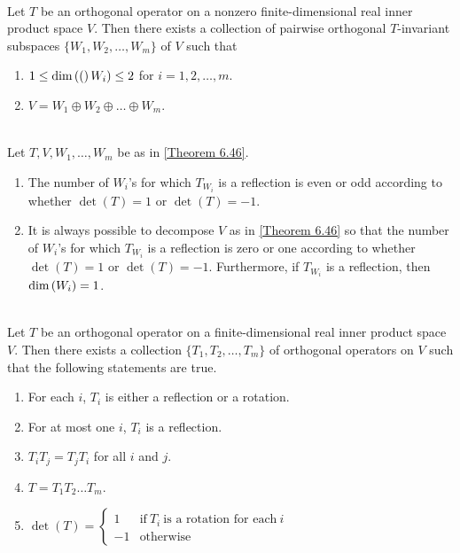 \begin{theorem}\label{Theorem 6.46}
	\hfill\\
	Let $T$ be an orthogonal operator on a nonzero finite-dimensional real inner product space $V$. Then there exists a collection of pairwise orthogonal $T$-invariant subspaces $\{W_1, W_2, \dots, W_m\}$ of $V$ such that

	\begin{enumerate}
		\item $1 \leq \text{dim}\left((\right)W_i) \leq 2$ for $i = 1, 2, \dots, m$.
		\item $V = W_1 \oplus W_2 \oplus \dots \oplus W_m$.
	\end{enumerate}
\end{theorem}

\begin{theorem}
	\hfill\\
	Let $T,V,W_1,\dots,W_m$ be as in \autoref{Theorem 6.46}.

	\begin{enumerate}
		\item The number of $W_i$'s for which $T_{W_i}$ is a reflection is even or odd according to whether $\det(T) = 1$ or $\det(T) = -1$.
		\item It is always possible to decompose $V$ as in \autoref{Theorem 6.46} so that the number of $W_i$'s for which $T_{W_i}$ is a reflection is zero or one according to whether $\det(T) = 1$ or $\det(T) = -1$. Furthermore, if $T_{W_i}$ is a reflection, then $\text{dim}\left(W_i\right) = 1$.
	\end{enumerate}
\end{theorem}

\begin{corollary}
	\hfill\\
	Let $T$ be an orthogonal operator on a finite-dimensional real inner product space $V$. Then there exists a collection $\{T_1, T_2, \dots, T_m\}$ of orthogonal operators on $V$ such that the following statements are true.

	\begin{enumerate}
		\item For each $i$, $T_i$ is either a reflection or a rotation.
		\item For at most one $i$, $T_i$ is a reflection.
		\item $T_iT_j = T_jT_i$ for all $i$ and $j$.
		\item $T = T_1T_2\dots T_m$.
		\item $\det(T) = \displaystyle\begin{cases}
				      1  & \text{if}\ T_i\ \text{is a rotation for each}\ i \\
				      -1 & \text{otherwise}
			      \end{cases}$
	\end{enumerate}
\end{corollary}
